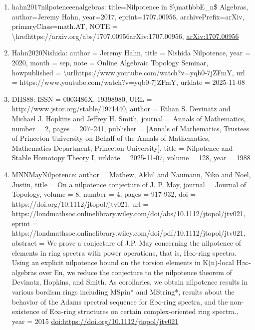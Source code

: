 \documentclass[11pt]{article}
\begin{document}
\begin{enumerate}[leftmargin=*]
  \item hahn2017nilpotenceenalgebras: title=Nilpotence in \$\textbackslash{}mathbbE\_n\$ Algebras, author=Jeremy Hahn, year=2017, eprint=1707.00956, archivePrefix=arXiv, primaryClass=math.AT, NOTE = \textbackslash{}hrefhttps://arxiv.org/abs/1707.00956arXiv:1707.00956, \href{https://arxiv.org/abs/1707.00956}{arXiv:1707.00956}
  \item Hahn2020Nishida: author = Jeremy Hahn, title = Nishida Nilpotence, year = 2020, month = sep, note = Online Algebraic Topology Seminar, howpublished = \textbackslash{}urlhttps://www.youtube.com/watch?v=yqb0-7jZFmY, url = https://www.youtube.com/watch?v=yqb0-7jZFmY, urldate = 2025-11-08
  \item DHS88: ISSN = 0003486X, 19398980, URL = http://www.jstor.org/stable/1971440, author = Ethan S. Devinatz and Michael J. Hopkins and Jeffrey H. Smith, journal = Annals of Mathematics, number = 2, pages = 207--241, publisher = [Annals of Mathematics, Trustees of Princeton University on Behalf of the Annals of Mathematics, Mathematics Department, Princeton University], title = Nilpotence and Stable Homotopy Theory I, urldate = 2025-11-07, volume = 128, year = 1988
  \item MNNMayNilpotence: author = Mathew, Akhil and Naumann, Niko and Noel, Justin, title = On a nilpotence conjecture of J. P. May, journal = Journal of Topology, volume = 8, number = 4, pages = 917-932, doi = https://doi.org/10.1112/jtopol/jtv021, url = https://londmathsoc.onlinelibrary.wiley.com/doi/abs/10.1112/jtopol/jtv021, eprint = https://londmathsoc.onlinelibrary.wiley.com/doi/pdf/10.1112/jtopol/jtv021, abstract = We prove a conjecture of J.P. May concerning the nilpotence of elements in ring spectra with power operations, that is, H\ensuremath{\infty}-ring spectra. Using an explicit nilpotence bound on the torsion elements in K(n)-local H\ensuremath{\infty}-algebras over En, we reduce the conjecture to the nilpotence theorem of Devinatz, Hopkins, and Smith. As corollaries, we obtain nilpotence results in various bordism rings including MSpin* and MString*, results about the behavior of the Adams spectral sequence for E\ensuremath{\infty}-ring spectra, and the non-existence of E\ensuremath{\infty}-ring structures on certain complex-oriented ring spectra., year = 2015 \href{https://doi.org/https://doi.org/10.1112/jtopol/jtv021}{doi:https://doi.org/10.1112/jtopol/jtv021}

\end{enumerate}
\end{document}

